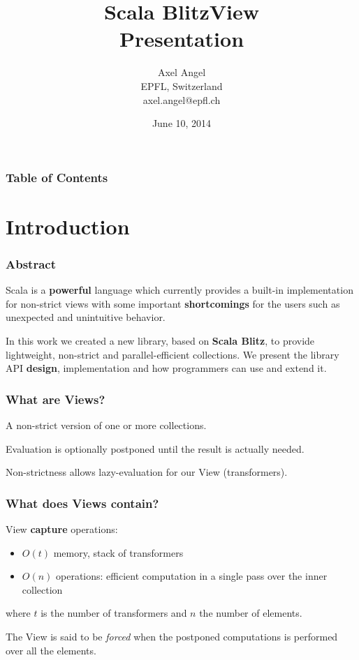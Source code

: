 \documentclass[12pt]{beamer}
\title{Scala BlitzView \\Presentation}
\author{Axel Angel \\EPFL, Switzerland \\axel.angel@epfl.ch}
\date{June 10, 2014}
\begin{document}
\begin{frame}
    \maketitle
\end{frame}

\begin{frame}
    \frametitle{Table of Contents}
    \tableofcontents
\end{frame}

\section{Introduction}
\begin{frame}
    \frametitle{Abstract}
    Scala is a {\bf powerful} language which currently provides a built-in implementation for non-strict views with some important {\bf shortcomings} for the users such as unexpected and unintuitive behavior.

    In this work we created a new library, based on {\bf Scala Blitz}, to provide lightweight, non-strict and parallel-efficient collections.
    We present the library API {\bf design}, implementation and how programmers can use and extend it.
\end{frame}

\begin{frame}
    \frametitle{What are Views?}
    \begin{definition}[View]
        A non-strict version of one or more collections.
    \end{definition}

    \begin{definition}
         Evaluation is optionally postponed until the result is actually needed.
    \end{definition}
    Non-strictness allows lazy-evaluation for our View (transformers).
\end{frame}

\begin{frame}
    \frametitle{What does Views contain?}
    View {\bf capture} operations:
    \begin{itemize}
        \item $O(t)$ memory, stack of transformers
        \item $O(n)$ operations: efficient computation in a single pass over the inner collection
    \end{itemize}
    where $t$ is the number of transformers and $n$ the number of elements.

    \begin{definition}
        The View is said to be {\it forced} when the postponed computations is performed over all the elements.
    \end{definition}
\end{frame}
\end{document}
